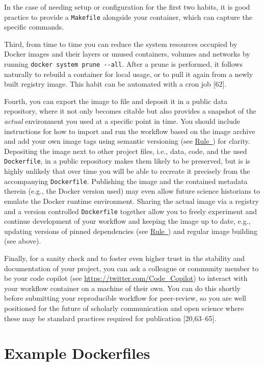 \documentclass[10pt,letterpaper]{article}
\begin{document}
In the case of needing setup or configuration for the first two habits,
it is good practice to provide a \texttt{Makefile} alongside your
container, which can capture the specific commands.

Third, from time to time you can reduce the system resources occupied by
Docker images and their layers or unused containers, volumes and
networks by running \texttt{docker\ system\ prune\ -\/-all}. After a
prune is performed, it follows naturally to rebuild a container for
local usage, or to pull it again from a newly built registry image. This
habit can be automated with a cron job {[}62{]}.

Fourth, you can export the image to file and deposit it in a public data
repository, where it not only becomes citable but also provides a
snapshot of the \emph{actual} environment you used at a specific point
in time. You should include instructions for how to import and run the
workflow based on the image archive and add your own image tags using
semantic versioning (see
\hyperref[{rule:base}]{Rule~}) for clarity.
Depositing the image next to other project files, i.e., data, code, and
the used \texttt{Dockerfile}, in a public repository makes them likely
to be preserved, but is is highly unlikely that over time you will be
able to recreate it precisely from the accompanying \texttt{Dockerfile}.
Publishing the image and the contained metadata therein (e.g., the
Docker version used) may even allow future science historians to emulate
the Docker runtime environment. Sharing the actual image via a registry
and a version controlled \texttt{Dockerfile} together allow you to
freely experiment and continue development of your workflow and keeping
the image up to date, e.g., updating versions of pinned dependencies
(see \hyperref[{rule:pinning}]{Rule~}) and
regular image building (see above).

Finally, for a sanity check and to foster even higher trust in the
stability and documentation of your project, you can ask a colleague or
community member to be your code copilot (see
\url{https://twitter.com/Code_Copilot}) to interact with your workflow
container on a machine of their own. You can do this shortly before
submitting your reproducible workflow for peer-review, so you are well
positioned for the future of scholarly communication and open science
where these may be standard practices required for publication
{[}20,63--65{]}.

\hypertarget{example-dockerfiles}{%
\section{Example Dockerfiles}\label{example-dockerfiles}}
\end{document}
